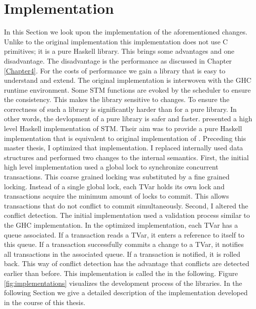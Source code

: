 
\chapter{Implementation} %

\label{Chapter3}

In this Section we look upon the implementation of the aforementioned changes. Unlike to the original
implementation this implementation does not use C primitives; it is a pure Haskell library. This brings some advantages 
and one disadvantage. The disadvantage is the performance as discussed in Chapter \ref{Chapter4}.
For the costs of performance we gain a library that is easy to understand and extend. The original 
implementation is interwoven with the GHC runtime environment. Some STM functions are evoked by 
the scheduler to ensure the consistency. This makes the library sensitive to changes. 
To ensure the correctness of such a library is significantly harder than for a pure library. 
In other words, the devlopment of a pure library is safer
and faster. \parencite{STMHigh} presented a high level Haskell implementation of STM. Their aim
was to provide a pure Haskell implementation that is equivalent to original implementation of 
\parencite{STMBase}. Preceding this master thesis, I optimized that implementation. I replaced
internally used data structures and performed two changes to the internal semantics. First, 
the initial high level implementation used a global lock to synchronize concurrent transactions.
This coarse grained locking was substituted by a fine grained locking. Instead of a single
global lock, each TVar holds its own lock and transactions acquire the minimum amount of 
locks to commit. This allows transactions that do not conflict to commit simultaneously.
Second, I altered the conflict detection. The initial implementation used a validation process
similar to the GHC implementation. In the optimized implementation, each TVar has a queue associated. If a transaction reads 
a TVar, it enters a reference to itself to this queue. If a transaction successfully commits a change to a TVar, it 
notifies all transactions in the associated queue. If a transaction is notified, it is rolled back.
This way of conflict detection has the advantage that conflicts are detected earlier than before.
This implementation is called the  in the following. Figure 
\ref{fig:implementations} visualizes the development process of the libraries.
In the following Section we give a detailed description of the implementation developed in the course of this 
thesis. 

